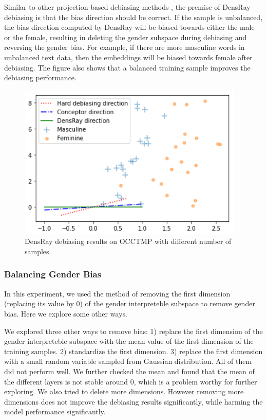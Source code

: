 Similar to other projection-based debiasing methods
\cite{bolukbasi2016man,zhao2019gender,dev2019attenuating}, the premise of DensRay debiasing is
that the bias direction should be correct. If the sample is
unbalanced, the bias direction computed by DensRay will be
biased towards either the male or the female, resulting in
deleting the gender subspace during debiasing and reversing
the gender bias. For example, if there are more masculine words in
unbalanced text data, then the embeddings will be biased
towards female after debiasing. The figure also shows that
a balanced training sample improves the debiasing
performance.
\begin{figure}[h]
    \centering
    \includegraphics[width=0.5\linewidth]{samples}
    \caption{DensRay debiasing results on OCCTMP with different number of samples.}
\end{figure}

\subsubsection{Balancing Gender Bias}
In this experiment, we used the method of removing the first dimension (replacing its value by $0$) of the gender interpreteble subspace to remove gender bias. Here we explore some other ways.

We explored three other ways to remove bias: 1) replace the first dimension of the gender interpreteble subspace with the mean value of the first dimension of the training samples. 2) standardize the first dimension. 3) replace the first dimension with a small random variable sampled from Gaussian distribution. All of them did not perform well. We further checked the mean and found that the mean of the different layers is not stable around 0, which is a problem worthy for further exploring. We also tried to delete more dimensions. However removing more dimensions does not improve the debiasing results significantly, while harming the model performance significantly.


